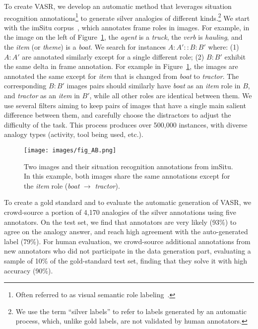\documentclass[letterpaper]{article} \usepackage{aaai23}  \usepackage{times}  \usepackage{helvet}  \usepackage{courier}  \usepackage[hyphens]{url}  \usepackage{graphicx} \urlstyle{rm} \def\UrlFont{\rm}  \usepackage{natbib}  \usepackage{caption} \frenchspacing  \setlength{\pdfpagewidth}{8.5in}  \setlength{\pdfpageheight}{11in}  \usepackage{algorithm}
\begin{document}
To create VASR, we develop an automatic method that leverages situation recognition annotations\footnote{Often referred to as visual semantic role labeling~\cite{gupta2015visual}.} to generate silver analogies of different kinds.\footnote{We use the term ``silver labels'' to refer to labels generated by an automatic process, which, unlike gold labels, are not validated by human annotators.} We start with the imSitu corpus~\cite{yatskar2016situation}, which annotates frame roles in images. For example, in the image on the left of Figure~\ref{fig:fig_AB}, the \emph{agent} is a \emph{truck}, the \emph{verb} is \emph{hauling}, and the \emph{item} (or \textit{theme}) is a \emph{boat}. We search for instances $A:A' :: B:B'$ where: (1) $A:A'$ are annotated similarly except for a single different role; (2) $B:B'$ exhibit the same delta in frame annotation. For example in Figure~\ref{fig:fig_AB}, the images are annotated the same except for \emph{item} that is changed from \emph{boat} to \emph{tractor}. The corresponding $B:B'$ images pairs should similarly have \emph{boat} as an \emph{item} role in $B$, and \emph{tractor} as an \emph{item} in $B'$, while all other roles are identical between them. We use several filters aiming to keep pairs of images that have a single main salient difference between them, and carefully choose the distractors to adjust the difficulty of the task.
This process produces over 500,000 instances, with diverse analogy types (activity, tool being used, etc.).


\begin{figure}[!tb]
\centering
\newcommand{\figlen}[0]{\columnwidth}
    \texttt{[image: images/fig\_AB.png]}\\
    \caption{Two images and their situation recognition annotations from imSitu. In this example, both images share the same annotations except for the \emph{item} role (\emph{boat} $\rightarrow$ \emph{tractor}).}
    \label{fig:fig_AB}
\end{figure}

To create a gold standard and to evaluate the automatic generation of VASR, we crowd-source a portion of 4,170 analogies of the silver annotations using five annotators. On the test set, we find that annotators are very likely (93\%) to agree on the analogy answer, and reach high agreement with the auto-generated label (79\%). For human evaluation, we crowd-source additional annotations from new annotators who did not participate in the data generation part, evaluating a sample of 10\% of the gold-standard test set, finding that they solve it with high accuracy (90\%).
\end{document}
